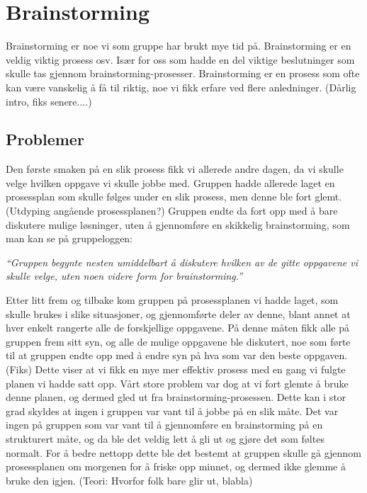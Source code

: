\section{Brainstorming}
Brainstorming er noe vi som gruppe har brukt mye tid på. Brainstorming er en veldig viktig prosess osv. Især for oss som hadde en del viktige beslutninger som skulle tas gjennom brainstorming-prosesser. Brainstorming er en prosess som ofte kan være vanskelig å få til riktig, noe vi fikk erfare ved flere anledninger. (Dårlig intro, fiks senere....)

\subsection{Problemer}
Den første smaken på en slik prosess fikk vi allerede andre dagen, da vi skulle velge hvilken oppgave vi skulle jobbe med. Gruppen hadde allerede laget en prosessplan som skulle følges under en slik prosess, men denne ble fort glemt. (Utdyping angående prosessplanen?) Gruppen endte da fort opp med å bare diskutere mulige løsninger, uten å gjennomføre en skikkelig brainstorming, som man kan se på gruppeloggen: \newline

\emph{“Gruppen begynte nesten umiddelbart å diskutere hvilken av de gitte oppgavene vi skulle velge, uten noen videre form for brainstorming.”} \newline

Etter litt frem og tilbake kom gruppen på prosessplanen vi hadde laget, som skulle brukes i slike situasjoner, og gjennomførte deler av denne, blant annet at hver enkelt rangerte alle de forskjellige oppgavene. På denne måten fikk alle på gruppen frem sitt syn, og alle de mulige oppgavene ble diskutert, noe som førte til at gruppen endte opp med å endre syn på hva som var den beste oppgaven.(Fiks) Dette viser at vi fikk en mye mer effektiv prosess med en gang vi fulgte planen vi hadde satt opp. Vårt store problem var dog at vi fort glemte å bruke denne planen, og dermed gled ut fra brainstorming-prosessen. Dette  kan i stor grad skyldes at ingen i gruppen var vant til å jobbe på en slik måte. Det var ingen på gruppen som var vant til å gjennomføre en brainstorming på en strukturert måte, og da ble det veldig lett å gli ut og gjøre det som føltes normalt. For å bedre nettopp dette ble det bestemt at gruppen skulle gå gjennom prosessplanen om morgenen for å friske opp minnet, og dermed ikke glemme å bruke den igjen. (Teori: Hvorfor folk bare glir ut, blabla) \newline


